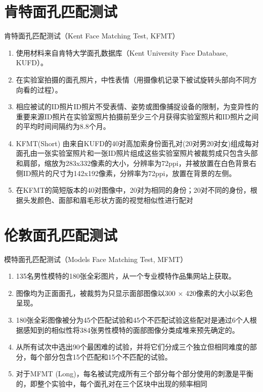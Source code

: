 \documentclass[]{ctexbook}
\providecommand{\tightlist}{%
  \setlength{\itemsep}{0pt}\setlength{\parskip}{0pt}}
\theoremstyle{definition}
\theoremstyle{definition}
\theoremstyle{definition}
\theoremstyle{definition}
\theoremstyle{remark}
\begin{document}
\section{肯特面孔匹配测试}\label{ux80afux7279ux9762ux5b54ux5339ux914dux6d4bux8bd5}

肯特面孔匹配测试（Kent Face Matching Test, KFMT）

\begin{enumerate}
\def\labelenumi{\arabic{enumi}.}
\tightlist
\item
  使用材料来自肯特大学面孔数据库（Kent University Face Database, KUFD）。\\
\item
  在实验室拍摄的面孔照片，中性表情（用摄像机记录下被试旋转头部向不同方向看的过程）。\\
\item
  相应被试的ID照片ID照片不受表情、姿势或图像捕捉设备的限制，为变异性的重要来源ID照片在实验室照片拍摄前至少三个月获得实验室照片和ID照片之间的平均时间间隔约为8.8个月。\\
\item
  KFMT(Short) 由来自KUFD的40对高加索身份面孔对(20对男20对女)组成每对面孔由一张实验室照片和一张ID照片组成这些实验室照片被裁剪成只包含头部和肩部，缩放为283x332像素的大小，分辨率为72ppi，并被放置在白色背景右侧ID照片的尺寸为142x192像素，分辨率为72ppi，放置在背景的左侧。\\
\item
  在KFMT的简短版本的40对图像中，20对为相同的身份；20对不同的身份，根据头发颜色、面部和眉毛形状方面的视觉相似性进行配对
\end{enumerate}

\section{伦敦面孔匹配测试}\label{ux4f26ux6566ux9762ux5b54ux5339ux914dux6d4bux8bd5}

模特面孔匹配测试（Models Face Matching Test, MFMT）

\begin{enumerate}
\def\labelenumi{\arabic{enumi}.}
\tightlist
\item
  135名男性模特的180张全彩图片，从一个专业模特作品集网站上获取。\\
\item
  图像均为正面面孔，被裁剪为只显示面部图像以300 × 420像素的大小以彩色呈现。\\
\item
  180张全彩图像被分为45个匹配试验和45个不匹配试验这些配对是通过6个人根据感知到的相似性将384张男性模特的面部图像分类成堆来预先确定的。\\
\item
  从所有试次中选出90个最困难的试验，并将它们分成三个独立但相同难度的部分，每个部分包含15个匹配和15个不匹配的试验。\\
\item
  对于MFMT (Long)，每名被试完成所有三个部分每个部分使用的刺激是平衡的，即整个实验中，每个面孔对在三个区块中出现的频率相同
\end{enumerate}
\end{document}
